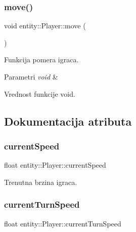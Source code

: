 \subsubsection{\texorpdfstring{move()}{move()}}
{\footnotesize\ttfamily void entity\+::\+Player\+::move (\begin{DoxyParamCaption}{ }\end{DoxyParamCaption})}



Funkcija pomera igraca. 


\begin{DoxyParams}{Parametri}
{\em void} & \\
\hline
\end{DoxyParams}
\begin{DoxyReturn}{Vrednost funkcije}
void. 
\end{DoxyReturn}


\subsection{Dokumentacija atributa}
\mbox{\label{classentity_1_1Player_a06f0a95dc0b0efc3299a07f90e91dd25}} 
\subsubsection{\texorpdfstring{current\+Speed}{currentSpeed}}
{\footnotesize\ttfamily float entity\+::\+Player\+::current\+Speed\hspace{0.3cm}{\ttfamily [private]}}



Trenutna brzina igraca. 

\mbox{\label{classentity_1_1Player_afaac869e93409af86a6f6fc53a95687e}} 
\subsubsection{\texorpdfstring{current\+Turn\+Speed}{currentTurnSpeed}}
{\footnotesize\ttfamily float entity\+::\+Player\+::current\+Turn\+Speed\hspace{0.3cm}{\ttfamily [private]}}



